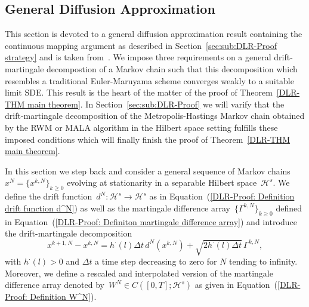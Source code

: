 \subsection{General Diffusion Approximation}
\label{sec:sub:DLR-General diffusion approximation}

This section is devoted to a general diffusion approximation result containing the continuous mapping argument as described in Section~\ref{sec:sub:DLR-Proof strategy} and is taken from~\autocite[Section 3.2]{Pillai2012}. We impose three requirements on a general drift-martingale decompostion of a Markov chain such that this decomposition which resembles a traditional Euler-Maruyama scheme converges weakly to a suitable limit SDE. This result is the heart of the matter of the proof of Theorem~\ref{DLR-THM main theorem}. In Section~\ref{sec:sub:DLR-Proof} we will varify that the drift-martingale decomposition of the Metropolis-Hastings Markov chain obtained by the RWM or MALA algorithm in the Hilbert space setting fulfills these imposed conditions which  will finally finish the proof of Theorem~\ref{DLR-THM main theorem}.

In this section we step back and consider a general sequence of Markov chains~$x^N = \{ x^{k,N} \}_{k\geq0}$ evolving at stationarity in a separable Hilbert space~$\mathcal{H}^s$. We define the drift function~$d^N: \mathcal{H}^s \to \mathcal{H}^s$ as in Equation~(\ref{DLR-Proof: Definition drift function d^N}) as well as the martingale difference array~$\{\Gamma^{k,N}\}_{k\geq0}$ defined in Equation~(\ref{DLR-Proof: Definiton martingale difference array}) and introduce the drift-martingale decomposition
\begin{equation}
  \label{DLR-Proof: drift-martingale decomposition for general diffusion approximation}
 x^{k+1,N} - x^{k,N} = h^{\cdot}(l) \Delta t \, d^N(x^{k,N}) + \sqrt{2 h^{\cdot}(l) \Delta t} \, \Gamma^{k,N},
\end{equation}
with $h^{\cdot}(l)>0$ and $\Delta t$ a time step decreasing to zero for $N$ tending to infinity. Moreover, we define a rescaled and interpolated version of the martingale difference array denoted by~$W^N \in C([0,T];\mathcal{H}^s)$ as given in Equation~(\ref{DLR-Proof: Definition W^N}).


